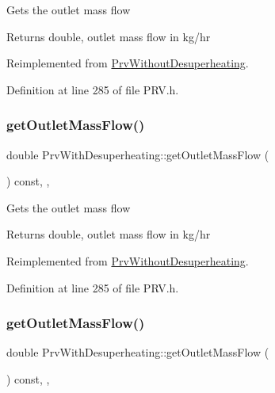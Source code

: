 Gets the outlet mass flow \begin{DoxyReturn}{Returns}
double, outlet mass flow in kg/hr 
\end{DoxyReturn}


Reimplemented from \hyperlink{class_prv_without_desuperheating_aefe4227f2c01209ba4ce79f6b5825d73}{Prv\+Without\+Desuperheating}.



Definition at line 285 of file P\+R\+V.\+h.

\mbox{\label{class_prv_with_desuperheating_a76c03ff2f54c85cd0c80543f23549635}} 
\subsubsection{\texorpdfstring{get\+Outlet\+Mass\+Flow()}{getOutletMassFlow()}\hspace{0.1cm}{\footnotesize\ttfamily [2/3]}}
{\footnotesize\ttfamily double Prv\+With\+Desuperheating\+::get\+Outlet\+Mass\+Flow (\begin{DoxyParamCaption}{ }\end{DoxyParamCaption}) const\hspace{0.3cm}{\ttfamily [inline]}, {\ttfamily [override]}, {\ttfamily [virtual]}}

Gets the outlet mass flow \begin{DoxyReturn}{Returns}
double, outlet mass flow in kg/hr 
\end{DoxyReturn}


Reimplemented from \hyperlink{class_prv_without_desuperheating_aefe4227f2c01209ba4ce79f6b5825d73}{Prv\+Without\+Desuperheating}.



Definition at line 285 of file P\+R\+V.\+h.

\mbox{\label{class_prv_with_desuperheating_a76c03ff2f54c85cd0c80543f23549635}} 
\subsubsection{\texorpdfstring{get\+Outlet\+Mass\+Flow()}{getOutletMassFlow()}\hspace{0.1cm}{\footnotesize\ttfamily [3/3]}}
{\footnotesize\ttfamily double Prv\+With\+Desuperheating\+::get\+Outlet\+Mass\+Flow (\begin{DoxyParamCaption}{ }\end{DoxyParamCaption}) const\hspace{0.3cm}{\ttfamily [inline]}, {\ttfamily [override]}, {\ttfamily [virtual]}}

